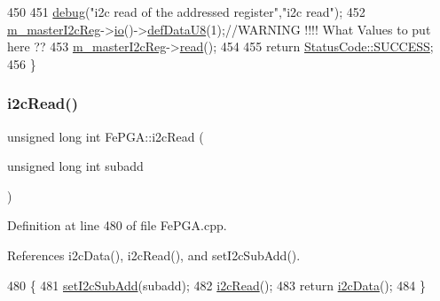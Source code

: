 \begin{DoxyCode}
450 
451   \hyperlink{classObject_aac010553f022165573714b7014a15f0d}{debug}(\textcolor{stringliteral}{"i2c read of the addressed register"},\textcolor{stringliteral}{"i2c read"});
452   \hyperlink{classFePGA_adb390ea8de4a6cbce648dc62e4405f32}{m\_masterI2cReg}->\hyperlink{classIOobject_af04fb94137c3d86849f478ac5afab5d1}{io}()->\hyperlink{classIOdata_a80bb230b61062b447db5832e43bf7b44}{defDataU8}(1);\textcolor{comment}{//WARNING !!!! What Values to put here ??}
453   \hyperlink{classFePGA_adb390ea8de4a6cbce648dc62e4405f32}{m\_masterI2cReg}->\hyperlink{classIOobject_aa07610c11963b1db6710e3c76ceea456}{read}();
454 
455   \textcolor{keywordflow}{return} \hyperlink{classStatusCode_a6f565cbeadc76d14c72f047e5e85eb4badd0da38d3ba0d922efd1f4619bc37ad8}{StatusCode::SUCCESS};
456 \}
\end{DoxyCode}
\mbox{\label{classFePGA_adf1c43786131d0f500b4662a877229c7}} 
\subsubsection{\texorpdfstring{i2c\+Read()}{i2cRead()}\hspace{0.1cm}{\footnotesize\ttfamily [2/2]}}
{\footnotesize\ttfamily unsigned long int Fe\+P\+G\+A\+::i2c\+Read (\begin{DoxyParamCaption}\item[{unsigned long int}]{subadd }\end{DoxyParamCaption})}



Definition at line 480 of file Fe\+P\+G\+A.\+cpp.



References i2c\+Data(), i2c\+Read(), and set\+I2c\+Sub\+Add().


\begin{DoxyCode}
480                                                         \{
481   \hyperlink{classFePGA_a37c1ee5bf89667c641f321479697166f}{setI2cSubAdd}(subadd);
482   \hyperlink{classFePGA_a939c5c23077210a2ad851a12694657a4}{i2cRead}();
483   \textcolor{keywordflow}{return} \hyperlink{classFePGA_a9c261a09d323c07ec4b9e925d4dfc353}{i2cData}();
484 \}
\end{DoxyCode}
\mbox{\label{classFePGA_ab51ac1c71e33f7444212de0e89e1f436}} 
